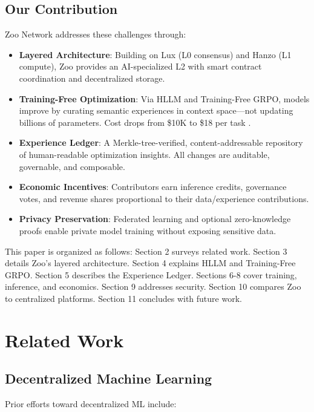 \documentclass[11pt,a4paper]{article}
\begin{document}
\subsection{Our Contribution}

Zoo Network addresses these challenges through:

\begin{itemize}[leftmargin=*]
\item \textbf{Layered Architecture}: Building on Lux (L0 consensus) and Hanzo (L1 compute), Zoo provides an AI-specialized L2 with smart contract coordination and decentralized storage.
\item \textbf{Training-Free Optimization}: Via HLLM and Training-Free GRPO, models improve by curating semantic experiences in context space—not updating billions of parameters. Cost drops from \$10K to \$18 per task \cite{tencent2025grpo}.
\item \textbf{Experience Ledger}: A Merkle-tree-verified, content-addressable repository of human-readable optimization insights. All changes are auditable, governable, and composable.
\item \textbf{Economic Incentives}: Contributors earn inference credits, governance votes, and revenue shares proportional to their data/experience contributions.
\item \textbf{Privacy Preservation}: Federated learning and optional zero-knowledge proofs enable private model training without exposing sensitive data.
\end{itemize}

This paper is organized as follows: Section 2 surveys related work. Section 3 details Zoo's layered architecture. Section 4 explains HLLM and Training-Free GRPO. Section 5 describes the Experience Ledger. Sections 6-8 cover training, inference, and economics. Section 9 addresses security. Section 10 compares Zoo to centralized platforms. Section 11 concludes with future work.

\section{Related Work}

\subsection{Decentralized Machine Learning}

Prior efforts toward decentralized ML include:
\end{document}
